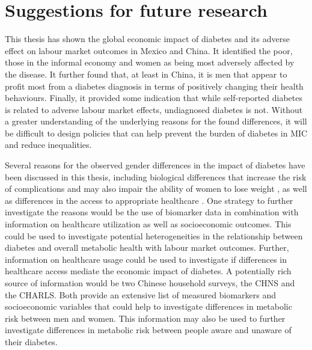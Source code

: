 \section{Suggestions for future research}

This thesis has shown the global economic impact of diabetes and its adverse effect on labour market outcomes in Mexico and China. It identified the poor, those in the informal economy and women as being most adversely affected by the disease. It further found that, at least in China, it is men that appear to profit most from a diabetes diagnosis in terms of positively changing their health behaviours. Finally, it provided some indication that while self-reported diabetes is related to adverse labour market effects, undiagnosed diabetes is not. Without a greater understanding of the underlying reasons for the found differences, it will be difficult to design policies that can help prevent the burden of diabetes in \ac{MIC} and reduce inequalities.

Several reasons for the observed gender differences in the impact of diabetes have been discussed in this thesis, including biological differences that increase the risk of complications \textcite{Peters2014,Peters2015,Arnetz2014,Roche2013,Policardo2014,Catalan2015,Engelmann2016,Seghieri2015} and may also impair the ability of women to lose weight \parencite{Penno2013}, as well as differences in the access to appropriate healthcare \parencite{Penno2013}. One strategy to further investigate the reasons would be the use of biomarker data in combination with information on healthcare utilization as well as socioeconomic outcomes. This could be used to investigate potential heterogeneities in the relationship between diabetes and overall metabolic health with labour market outcomes. Further, information on healthcare usage could be used to investigate if differences in healthcare access mediate the economic impact of diabetes. A potentially rich source of information would be two Chinese household surveys, the \acf{CHNS} and the \acf{CHARLS}. Both provide an extensive list of measured biomarkers and socioeconomic variables that could help to investigate differences in metabolic risk between men and women. This information may also be used to further investigate differences in metabolic risk between people aware and unaware of their diabetes.

